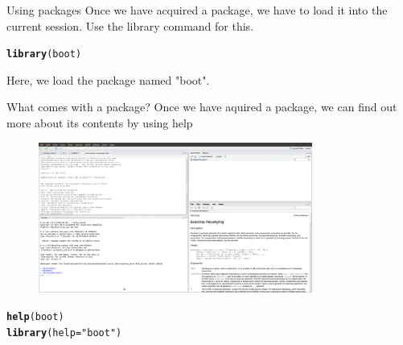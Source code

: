 \documentclass{beamer}\usepackage[]{graphicx}\usepackage[]{color}
\makeatletter
\newcommand{\hlstr}[1]{\textcolor[rgb]{0.192,0.494,0.8}{#1}}%
\newcommand{\hlstd}[1]{\textcolor[rgb]{0.345,0.345,0.345}{#1}}%
\newcommand{\hlkwc}[1]{\textcolor[rgb]{0.333,0.667,0.333}{#1}}%
\newcommand{\hlkwd}[1]{\textcolor[rgb]{0.737,0.353,0.396}{\textbf{#1}}}%
\newenvironment{kframe}{%
 \def\at@end@of@kframe{}%
 \ifinner\ifhmode%
  \def\at@end@of@kframe{\end{minipage}}%
  \begin{minipage}{\columnwidth}%
 \fi\fi%
 \def\FrameCommand##1{\hskip\@totalleftmargin \hskip-\fboxsep
 \colorbox{shadecolor}{##1}\hskip-\fboxsep
     \hskip-\linewidth \hskip-\@totalleftmargin \hskip\columnwidth}%
 \MakeFramed {\advance\hsize-\width
   \@totalleftmargin\z@ \linewidth\hsize
   \@setminipage}}%
 {\par\unskip\endMakeFramed%
 \at@end@of@kframe}
\newenvironment{knitrout}{}{} %
\makeatother
\begin{document}
\begin{frame}[fragile]{Using packages}
Once we have acquired a package, we have to load it into the current session. Use the library command for this.
\begin{knitrout}
\color{fgcolor}\begin{kframe}
\begin{alltt}
\hlkwd{library}\hlstd{(boot)}
\end{alltt}
\end{kframe}
\end{knitrout}

Here, we load the package named "boot".
\end{frame}


\begin{frame}[fragile]{What comes with a package?}
Once we have aquired a package, we can find out more about its contents by using help
\begin{figure}[ht!]
\centering
\includegraphics[width=90mm]{pictures/help_boot.jpg}
\label{overflow}
\end{figure}
\begin{knitrout}
\color{fgcolor}\begin{kframe}
\begin{alltt}
\hlkwd{help}\hlstd{(boot)}
\hlkwd{library}\hlstd{(}\hlkwc{help} \hlstd{=} \hlstr{"boot"}\hlstd{)}
\end{alltt}
\end{kframe}
\end{knitrout}

\end{frame}
\end{document}
